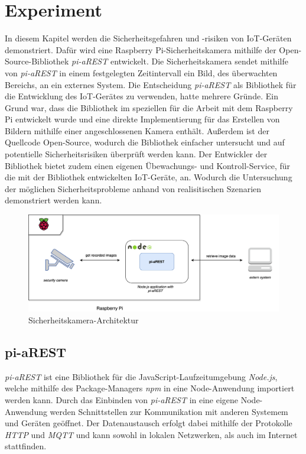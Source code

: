 \section{Experiment}
In diesem Kapitel werden die Sicherheitsgefahren und -risiken von IoT-Geräten demonstriert. 
Dafür wird eine Raspberry Pi-Sicherheitskamera mithilfe der Open-Source-Bibliothek \textit{pi-aREST} 
entwickelt. Die Sicherheitskamera sendet mithilfe von \textit{pi-aREST} in einem festgelegten 
Zeitintervall ein Bild, des überwachten Bereichs, an ein externes System. Die Entscheidung \textit{pi-aREST} 
als Bibliothek für die Entwicklung des IoT-Gerätes zu verwenden, hatte mehrere Gründe. 
Ein Grund war, dass die Bibliothek im speziellen für die Arbeit mit dem Raspberry Pi entwickelt wurde
und eine direkte Implementierung für das Erstellen von Bildern mithilfe einer angeschlossenen Kamera
enthält. Außerdem ist der Quellcode Open-Source, wodurch die Bibliothek einfacher untersucht
und auf potentielle Sicherheitsrisiken überprüft werden kann. Der Entwickler der Bibliothek
bietet zudem einen eigenen Übewachungs- und Kontroll-Service, für die mit der Bibliothek
entwickelten IoT-Geräte, an. Wodurch die Untersuchung der möglichen Sicherheitsprobleme anhand von 
realisitischen Szenarien demonstriert werden kann.  \\

\begin{figure}[h]
  \centering
  \includegraphics[width=125mm]{images/raspberry_architecture.png}
  \caption{Sicherheitskamera-Architektur}
  \label{fig:arch-raspberrypi}
\end{figure}


\subsection{pi-aREST}
\textit{pi-aREST} ist eine Bibliothek für die JavaScript-Laufzeitumgebung \textit{Node.js}, welche mithilfe
des Package-Managers \textit{npm} in eine Node-Anwendung importiert werden kann. Durch das Einbinden
von \textit{pi-aREST} in eine eigene Node-Anwendung werden Schnittstellen zur Kommunikation mit anderen
Systemem und Geräten geöffnet. Der Datenaustausch erfolgt dabei mithilfe der Protokolle \textit{HTTP} 
und \textit{MQTT} und kann sowohl in lokalen Netzwerken, als auch im Internet stattfinden.

